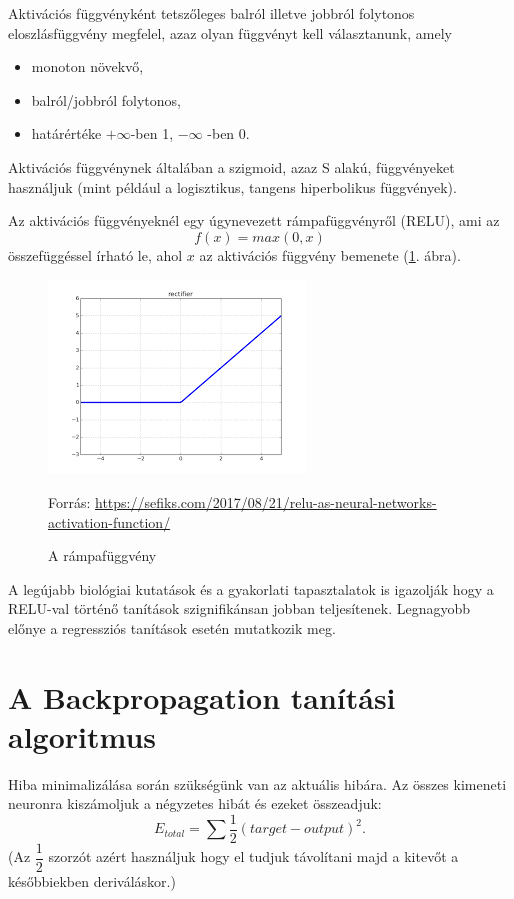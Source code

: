 Aktivációs függvényként tetszőleges balról illetve jobbról folytonos eloszlásfüggvény megfelel, azaz olyan függvényt kell választanunk, amely
\begin{itemize}
\item monoton növekvő,
\item balról/jobbról folytonos,
\item határértéke $+\infty$-ben 1, $-\infty$ -ben 0.
\end{itemize}

Aktivációs függvénynek általában a szigmoid, azaz S alakú, függvényeket használjuk (mint például a logisztikus, tangens hiperbolikus függvények).

Az aktivációs függvényeknél egy úgynevezett rámpafüggvényről (RELU), ami az
$$
f(x) = max(0,x)
$$
összefüggéssel írható le, ahol $x$ az aktivációs függvény bemenete (\ref{fig:relu}. ábra).

\begin{figure}[h]
\centering
\includegraphics[scale=1.0]{images/relu}
\caption{A rámpafüggvény}
\label{fig:relu}
Forrás: \url{https://sefiks.com/2017/08/21/relu-as-neural-networks-activation-function/}
\end{figure}

A legújabb biológiai kutatások és a gyakorlati tapasztalatok is igazolják hogy a RELU-val történő tanítások szignifikánsan jobban teljesítenek. Legnagyobb előnye a regressziós tanítások esetén mutatkozik meg.

\section{A Backpropagation tanítási algoritmus}

Hiba minimalizálása során szükségünk van az aktuális hibára. Az összes kimeneti neuronra kiszámoljuk a négyzetes hibát és ezeket összeadjuk:
$$
E_{total} = \sum \dfrac{1}{2}(target - output)^2.
$$
(Az $\dfrac{1}{2}$ szorzót azért használjuk hogy el tudjuk távolítani majd a kitevőt a későbbiekben deriváláskor.)

